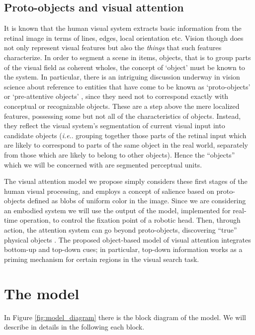 \documentclass{llncs}
\makeatletter
\DeclareRobustCommand\onedot{\futurelet\@let@token\@onedot}
\def\@onedot{\ifx\@let@token.\else.\null\fi\xspace}
\def\ie{\emph{i.e}\onedot} \def\Ie{\emph{I.e}\onedot}
\makeatother
\begin{document}
\subsection{Proto-objects and visual attention}
It is known that the human visual
system extracts basic information from the retinal
image in terms of lines, edges, local orientation etc.
Vision though does not only represent visual features
but also the \emph{things} that such features characterize. In
order to segment a scene in items, objects, that is to
group parts of the visual field as coherent wholes, the
concept of `object' must be known to the system.
In particular, there is an intriguing discussion underway
in vision science about reference to entities that have
come to be known as `proto-objects' or `pre-attentive
objects' \cite{RensinkORC97,Rensink00a,Pylyshyn01}, since they need not to correspond
exactly with conceptual or recognizable objects.
These are a step above the mere localized
features, possessing some but not all of the
characteristics of objects.
Instead, they reflect the visual
system's segmentation of current visual input into candidate objects (\ie grouping
together those parts of the retinal input which are likely to correspond to parts of the
same object in the real world, separately from those which are likely to belong to
other objects).
Hence the ``objects'' which we will be concerned with are segmented perceptual units.

The visual attention model we propose simply considers
these first stages of the human visual processing, and
employs a concept of salience based on proto-objects
defined as blobs of uniform color in the
image. Since we are considering an embodied system
we will use the output of the model, implemented for 
real-time operation, to control the fixation point of a robotic head.
Then, through action, the attention system can go
beyond proto-objects, discovering ``true'' physical objects \cite{MettaF03,Orabona07}.
The proposed object-based model of visual
attention integrates bottom-up and top-down cues;
in particular, top-down information works as a priming
mechanism for certain regions in the visual search task.


\section{The model}
\label{sec:att_model}
In Figure \ref{fig:model_diagram} there is the block diagram of the model.
We will describe in details in the following each block.
\end{document}
